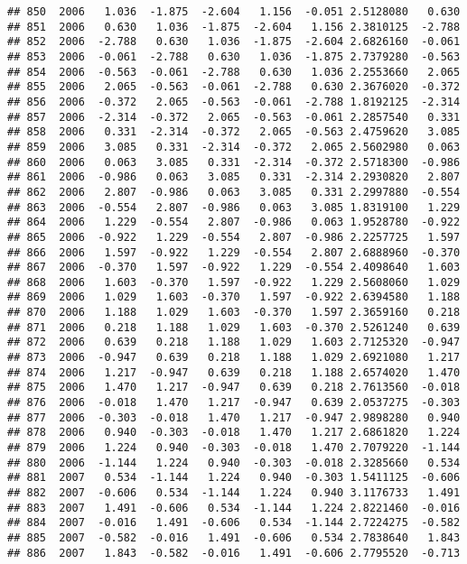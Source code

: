 \documentclass[]{article}
\begin{document}
\begin{verbatim}
## 850  2006   1.036  -1.875  -2.604   1.156  -0.051 2.5128080   0.630
## 851  2006   0.630   1.036  -1.875  -2.604   1.156 2.3810125  -2.788
## 852  2006  -2.788   0.630   1.036  -1.875  -2.604 2.6826160  -0.061
## 853  2006  -0.061  -2.788   0.630   1.036  -1.875 2.7379280  -0.563
## 854  2006  -0.563  -0.061  -2.788   0.630   1.036 2.2553660   2.065
## 855  2006   2.065  -0.563  -0.061  -2.788   0.630 2.3676020  -0.372
## 856  2006  -0.372   2.065  -0.563  -0.061  -2.788 1.8192125  -2.314
## 857  2006  -2.314  -0.372   2.065  -0.563  -0.061 2.2857540   0.331
## 858  2006   0.331  -2.314  -0.372   2.065  -0.563 2.4759620   3.085
## 859  2006   3.085   0.331  -2.314  -0.372   2.065 2.5602980   0.063
## 860  2006   0.063   3.085   0.331  -2.314  -0.372 2.5718300  -0.986
## 861  2006  -0.986   0.063   3.085   0.331  -2.314 2.2930820   2.807
## 862  2006   2.807  -0.986   0.063   3.085   0.331 2.2997880  -0.554
## 863  2006  -0.554   2.807  -0.986   0.063   3.085 1.8319100   1.229
## 864  2006   1.229  -0.554   2.807  -0.986   0.063 1.9528780  -0.922
## 865  2006  -0.922   1.229  -0.554   2.807  -0.986 2.2257725   1.597
## 866  2006   1.597  -0.922   1.229  -0.554   2.807 2.6888960  -0.370
## 867  2006  -0.370   1.597  -0.922   1.229  -0.554 2.4098640   1.603
## 868  2006   1.603  -0.370   1.597  -0.922   1.229 2.5608060   1.029
## 869  2006   1.029   1.603  -0.370   1.597  -0.922 2.6394580   1.188
## 870  2006   1.188   1.029   1.603  -0.370   1.597 2.3659160   0.218
## 871  2006   0.218   1.188   1.029   1.603  -0.370 2.5261240   0.639
## 872  2006   0.639   0.218   1.188   1.029   1.603 2.7125320  -0.947
## 873  2006  -0.947   0.639   0.218   1.188   1.029 2.6921080   1.217
## 874  2006   1.217  -0.947   0.639   0.218   1.188 2.6574020   1.470
## 875  2006   1.470   1.217  -0.947   0.639   0.218 2.7613560  -0.018
## 876  2006  -0.018   1.470   1.217  -0.947   0.639 2.0537275  -0.303
## 877  2006  -0.303  -0.018   1.470   1.217  -0.947 2.9898280   0.940
## 878  2006   0.940  -0.303  -0.018   1.470   1.217 2.6861820   1.224
## 879  2006   1.224   0.940  -0.303  -0.018   1.470 2.7079220  -1.144
## 880  2006  -1.144   1.224   0.940  -0.303  -0.018 2.3285660   0.534
## 881  2007   0.534  -1.144   1.224   0.940  -0.303 1.5411125  -0.606
## 882  2007  -0.606   0.534  -1.144   1.224   0.940 3.1176733   1.491
## 883  2007   1.491  -0.606   0.534  -1.144   1.224 2.8221460  -0.016
## 884  2007  -0.016   1.491  -0.606   0.534  -1.144 2.7224275  -0.582
## 885  2007  -0.582  -0.016   1.491  -0.606   0.534 2.7838640   1.843
## 886  2007   1.843  -0.582  -0.016   1.491  -0.606 2.7795520  -0.713

\end{verbatim}
\end{document}
